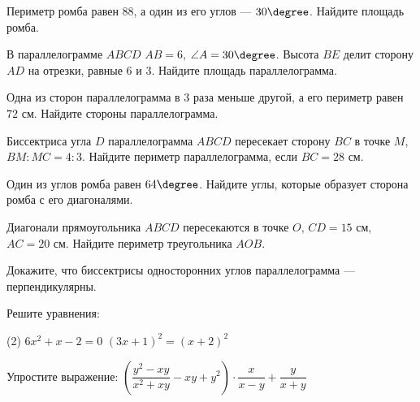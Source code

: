 \begin{exam}
	\begin{listofex}
		\item Периметр ромба равен \( 88 \), а один из его углов --- \( 30\degree \). Найдите площадь ромба.
		\item В параллелограмме \( ABCD \) \( AB=6 \), \( \angle A=30\degree \). Высота \( BE \) делит сторону \( AD \) на отрезки, равные \( 6 \) и \( 3 \). Найдите площадь параллелограмма.
		\item Одна из сторон параллелограмма в \( 3 \) раза меньше другой, а его периметр равен \( 72 \) см. Найдите стороны параллелограмма.
		\item Биссектриса угла \( D \) параллелограмма \( ABCD \) пересекает сторону \( BC \) в точке \( M \),\( BM:MC=4:3 \). Найдите периметр параллелограмма, если \( BC=28 \) см.
		\item Один из углов ромба равен \( 64\degree \). Найдите углы, которые образует сторона ромба с его диагоналями.
		\item Диагонали прямоугольника \( ABCD \) пересекаются в точке \( O \), \( CD=15 \) см, \( AC=20 \) см. Найдите периметр треугольника \( AOB \).
		\item Докажите, что биссектрисы односторонних углов параллелограмма --- перпендикулярны.
		\item Решите уравнения:
		\begin{tasks}(2)
			\task \( 6x^2+x-2=0 \)
			\task \( (3x+1)^2=(x+2)^2 \)
		\end{tasks}
		\item Упростите выражение: \quad \( \left( \dfrac{y^2-xy}{x^2+xy}-xy+y^2 \right)\cdot\dfrac{x}{x-y}+\dfrac{y}{x+y} \)
	\end{listofex}
\end{exam}
